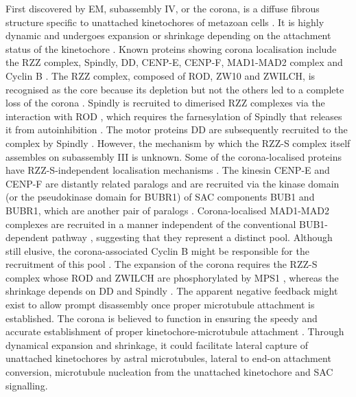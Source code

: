 First discovered by EM, subassembly IV, or the corona, is a diffuse fibrous structure specific to unattached kinetochores of metazoan cells \citep{Jokelainen1967TheCells}. It is highly dynamic and undergoes expansion or shrinkage depending on the attachment status of the kinetochore \citep{Kops2020CrowningSegregation}. Known proteins showing corona localisation include the RZZ complex, Spindly, DD, CENP-E, CENP-F, MAD1-MAD2 complex and Cyclin B \citep{McAinsh2022TheKinetochores}. The RZZ complex, composed of ROD, ZW10 and ZWILCH, is recognised as the core because its depletion but not the others led to a complete loss of the corona \citep{Rodriguez-Rodriguez2018DistinctExpansion, Kops2005ZW10Kinetochore, Silio2015KNL1-BubsKinetochores, Varma2013SpindleKinetochores, Auckland2020CENP-FCargoes, Currie2018Bub1Cells}. Spindly is recruited to dimerised RZZ complexes via the interaction with ROD \citep{Mosalaganti2017StructureSpindly, Pereira2018Self-AssemblyAttachment, Raisch2022StructureKinetochores}, which requires the farnesylation of Spindly that releases it from autoinhibition \citep{Sacristan2018DynamicMitosis}. The motor proteins DD are subsequently recruited to the complex by Spindly \citep{Mosalaganti2017StructureSpindly}. However, the mechanism by which the RZZ-S complex itself assembles on subassembly III is unknown. Some of the corona-localised proteins have RZZ-S-independent localisation mechanisms \citep{Ciossani2018TheKinases, Rodriguez-Rodriguez2018DistinctExpansion}. The kinesin CENP-E and CENP-F are distantly related paralogs and are recruited via the kinase domain (or the pseudokinase domain for BUBR1) of SAC components BUB1 and BUBR1, which are another pair of paralogs \citep{Ciossani2018TheKinases, Berto2018DisentanglingKinetochores}. Corona-localised MAD1-MAD2 complexes are recruited in a manner independent of the conventional BUB1-dependent pathway \citep{Pereira2018Self-AssemblyAttachment}, suggesting that they represent a distinct pool. Although still elusive, the corona-associated Cyclin B might be responsible for the recruitment of this pool \citep{Allan2020CyclinCheckpoint}. The expansion of the corona requires the RZZ-S complex whose ROD and ZWILCH are phosphorylated by MPS1 \citep{Rodriguez-Rodriguez2018DistinctExpansion, Sacristan2018DynamicMitosis, Pereira2018Self-AssemblyAttachment}, whereas the shrinkage depends on DD and Spindly \citep{Sacristan2018DynamicMitosis, Gassmann2010RemovalCells, Howell2001CytoplasmicInactivation}. The apparent negative feedback might exist to allow prompt disassembly once proper microtubule attachment is established. The corona is believed to function in ensuring the speedy and accurate establishment of proper kinetochore-microtubule attachment \citep{Kops2020CrowningSegregation}. Through dynamical expansion and shrinkage, it could facilitate lateral capture of unattached kinetochores by astral microtubules, lateral to end-on attachment conversion, microtubule nucleation from the unattached kinetochore and SAC signalling. 

